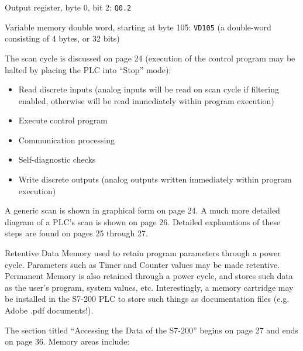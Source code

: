 \vskip 10pt

Output register, byte 0, bit 2: {\tt Q0.2}

\vskip 10pt

Variable memory double word, starting at byte 105: {\tt VD105} (a double-word consisting of 4 bytes, or 32 bits)







The scan cycle is discussed on page 24 (execution of the control program may be halted by placing the PLC into ``Stop'' mode):

\begin{itemize}
\item{} Read discrete inputs (analog inputs will be read on scan cycle if filtering enabled, otherwise will be read immediately within program execution)
\item{} Execute control program
\item{} Communication processing
\item{} Self-diagnostic checks
\item{} Write discrete outputs (analog outputs written immediately within program execution)
\end{itemize}

A generic scan is shown in graphical form on page 24.  A much more detailed diagram of a PLC's scan is shown on page 26.  Detailed explanations of these steps are found on pages 25 through 27.

\vskip 10pt

Retentive Data Memory used to retain program parameters through a power cycle.  Parameters such as Timer and Counter values may be made retentive.  Permanent Memory is also retained through a power cycle, and stores such data as the user's program, system values, etc.  Interestingly, a memory cartridge may be installed in the S7-200 PLC to store such things as documentation files (e.g. Adobe .pdf documents!).

\vskip 10pt

The section titled ``Accessing the Data of the S7-200'' begins on page 27 and ends on page 36.  Memory areas include:

